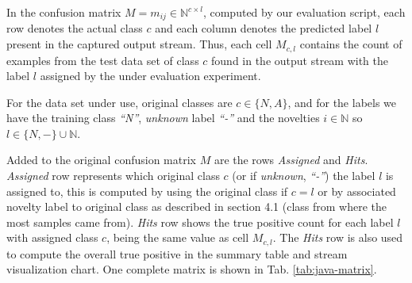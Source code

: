 In the confusion matrix $M = m_{ij} \in \mathbb{N} ^{c \times{} l}$, computed by
our evaluation script, each row denotes %
the actual class $c$ and each column denotes the predicted label $l$ present in
the captured output stream.
Thus, each cell $M_{c, l}$ contains the count of examples from the test data set
of class $c$ found in the output stream with the label $l$ assigned by the under
evaluation experiment.

For the data set under use, original classes are $c \in \{N, A\}$, and for the
labels we have the training class
\emph{``N''}, \emph{unknown} label \emph{``-''} and the novelties $i \in
\mathbb{N}$ so $l \in \{N, -\} \cup \mathbb{N}$.

Added to the original confusion matrix $M$ are the rows \emph{Assigned} and
\emph{Hits}.
\emph{Assigned} row represents which original class $c$ (or if \emph{unknown},
\emph{``-''}) the label $l$ is assigned to, this is computed by using the
original class if $c = l$ or by associated novelty label to original class as
described in \cite{DeFaria2015evaluation} section 4.1
(class from where the most samples came from).
\emph{Hits} row shows the true positive count for each label $l$
with assigned class $c$, being the same value as cell $M_{c, l}$.
The \emph{Hits} row is also used to compute the overall true positive
in the summary table and stream visualization chart.
One complete matrix is shown in Tab. \ref{tab:java-matrix}.

